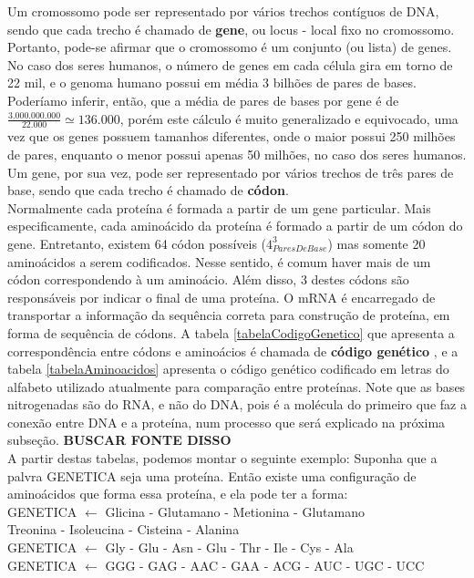\indent Um cromossomo pode ser representado por vários trechos contíguos de DNA, sendo que cada trecho é chamado de \textbf{gene}, ou locus - local fixo no cromossomo. Portanto, pode-se afirmar que o cromossomo é um conjunto (ou lista) de genes. No caso dos seres humanos, o número de genes em cada célula gira em torno de 22 mil,
 e o genoma humano possui em média 3 bilhões de pares de bases. Poderíamo inferir, então, que a média de pares de bases por gene é de $\frac{3.000.000.000}{22.000} \simeq 136.000$, porém este cálculo é muito generalizado e equivocado, uma vez que os genes possuem tamanhos diferentes, onde o maior possui 250 milhões de pares, enquanto o menor possui apenas 50 milhões, no caso dos seres humanos. %
  Um gene, por sua vez, pode ser representado por vários trechos de três pares de base, sendo que cada trecho é chamado de \textbf{códon}. \\

\indent Normalmente cada proteína é formada a partir de um gene particular. Mais especificamente, cada aminoácido da proteína é formado a partir de um códon do gene. Entretanto, existem 64 códon possíveis ($4_{ParesDeBase} ^3$) mas somente 20 aminoácidos a serem codificados. Nesse sentido, é comum haver mais de um códon correspondendo à um aminoácio. Além disso, 3 destes códons são responsáveis por indicar o final de uma proteína. O mRNA é encarregado de transportar a informação da sequência correta para construção de proteína, em forma de sequência de códons. A tabela \ref{tabelaCodigoGenetico} que apresenta a correspondência entre códons e aminoácios é chamada de \textbf{código genético} \cite{setubal97}, e a tabela \ref{tabelaAminoacidos} apresenta o código genético codificado em letras do alfabeto utilizado atualmente para comparação entre proteínas. Note que as bases nitrogenadas são do RNA, e não do DNA, pois é a molécula do primeiro que faz a conexão entre DNA e a proteína, num processo que será explicado na próxima subseção. \textbf{BUSCAR FONTE DISSO} \\

\indent A partir destas tabelas, podemos montar o seguinte exemplo: Suponha que a palvra GENETICA seja uma proteína. Então existe uma configuração de aminoácidos que forma essa proteína, e ela pode ter a forma: \\ 
\indent GENETICA $\leftarrow$ Glicina - Glutamano - Metionina - Glutamano \\
\hspace*{3.4cm}  Treonina - Isoleucina - Cisteina - Alanina \\
\indent GENETICA $\leftarrow$ Gly - Glu - Asn - Glu - Thr - Ile - Cys - Ala \\
\indent GENETICA $\leftarrow$ GGG - GAG - AAC - GAA - ACG - AUC - UGC - UCC \\


